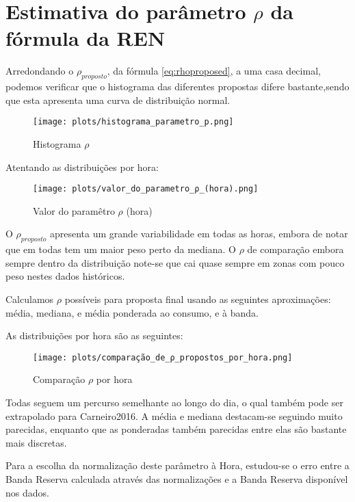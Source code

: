 \section{Estimativa do parâmetro $\rho$ da fórmula da REN}


Arredondando o $\rho_{proposto}$, da fórmula \ref{eq:rhoproposed}, a uma casa decimal, podemos verificar que o histograma das diferentes propostas difere bastante,sendo que esta apresenta uma curva de distribuição normal.\par


\begin{figure}[H]
    \centering
    \texttt{[image: plots/histograma\_parametro\_p.png]}
    \caption{Histograma $\rho$}
  \end{figure}


Atentando as distribuições por hora: \\

\begin{figure}[H]
    \centering
    \texttt{[image: plots/valor\_do\_parametro\_ρ\_(hora).png]}
    \caption{Valor do paramêtro $\rho$ (hora)}
  \end{figure}

O $\rho_{proposto}$ apresenta um grande variabilidade em todas as horas, embora de notar que em todas tem um maior peso perto da mediana. O $\rho$ de comparação embora sempre dentro da distribuição note-se que cai quase sempre em zonas com pouco peso nestes dados históricos.\par
Calculamos $\rho$ possíveis para proposta final usando as seguintes aproximações: média, mediana, e média ponderada ao consumo, e à banda.\par

As distribuições por hora são as seguintes:

\begin{figure}[H]
    \centering
    \texttt{[image: plots/comparação\_de\_ρ\_propostos\_por\_hora.png]}
    \caption{Comparação $\rho$ por hora}
\end{figure}

Todas seguem um percurso semelhante ao longo do dia, o qual também pode ser extrapolado para Carneiro2016. A média e mediana destacam-se seguindo muito parecidas, enquanto que as ponderadas também parecidas entre elas são bastante mais discretas.\par
Para a escolha da normalização deste parâmetro à Hora, estudou-se o erro entre a Banda Reserva calculada através das normalizações e a Banda Reserva disponível nos dados.\par


